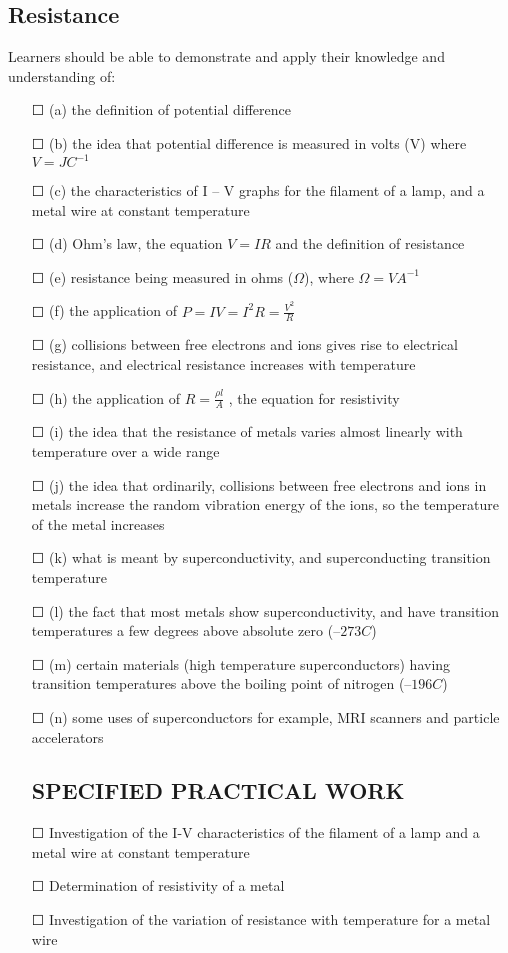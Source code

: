 \subsection{Resistance}Learners should be able to demonstrate and apply their knowledge and
understanding of:
\begin{itemize}
	\item[\Large{$\Square$}] (a) the definition of potential difference
	\item[\Large{$\Square$}]	(b) the idea that potential difference is measured in volts (V) where $V = J C^{-1}$
	\item[\Large{$\Square$}]	(c) the characteristics of I – V graphs for \sq the filament of a lamp, and \sq a metal wire at constant temperature
	\item[\Large{$\Square$}]	(d) Ohm's law, the equation \(V = IR\) and the definition of resistance
	\item[\Large{$\Square$}]	(e) resistance being measured in ohms ($\Omega$), where $\Omega = V A^{-1}$
	\item[\Large{$\Square$}]	(f) the application of \(P=IV=I^{2}R=\frac{V^{2}}{R}\)
	\item[\Large{$\Square$}]	(g) collisions between free electrons and ions gives rise to electrical resistance, and \sq electrical resistance increases with temperature
	\item[\Large{$\Square$}]	(h) the application of \(R=\frac{\rho l}{A}\) , the equation for resistivity
	\item[\Large{$\Square$}]	(i) the idea that the resistance of metals varies almost linearly with temperature	over a wide range
	\item[\Large{$\Square$}]	(j) the idea that ordinarily, collisions between free electrons and ions in metals increase the random vibration energy of the ions, so the temperature of the
	metal increases
	\item[\Large{$\Square$}]	(k) what is meant by \sq superconductivity, and \sq superconducting transition temperature
	\item[\Large{$\Square$}]	(l) the fact that most metals show superconductivity, and have transition temperatures a few degrees above absolute zero ($–273 C$)
	\item[\Large{$\Square$}]	(m) certain materials (high temperature superconductors) having transition temperatures above the boiling point of nitrogen ($–196 C$)
	\item[\Large{$\Square$}]	(n) some uses of superconductors for example, MRI scanners and particle
	accelerators
	\subsection*{SPECIFIED PRACTICAL WORK}
	\item[\Large{$\Square$}]Investigation of the I-V characteristics of the filament of a lamp and a metal wire at constant temperature
	\item[\Large{$\Square$}] Determination of resistivity of a metal
	\item[\Large{$\Square$}]Investigation of the variation of resistance with temperature for a metal wire
\end{itemize}
